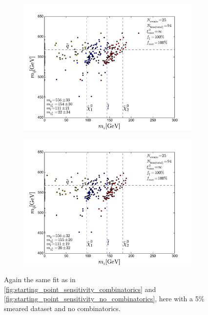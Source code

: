 \documentclass[twoside,english]{uiofysmaster}
\begin{document}
\begin{figure}[hbt]
	\begin{subfigure}[b]{0.45\textwidth}
		\includegraphics[width=\textwidth]{figures/improving_combinatorics/herwigpp_5psmear_lowtol_nocomb_800-500-300-50.pdf} 
		\caption{ }
	\end{subfigure}
	\begin{subfigure}[b]{0.45\textwidth}
		\includegraphics[width=\textwidth]{figures/improving_combinatorics/herwigpp_5psmear_lowtol_nocomb_1000-100-80-30.pdf}
		\caption{ } 
	\end{subfigure}
	\caption{Again the same fit as in \ref{fig:starting_point_sensitivity_combinatorics} and \ref{fig:starting_point_sensitivity_no_combinatorics}, here with a 5\% smeared dataset and no combinatorics.}
	\label{fig:moving_on-starting_point_sensitivity_no_combinatorics_5pmomsmear}
\end{figure} 
\end{document}
